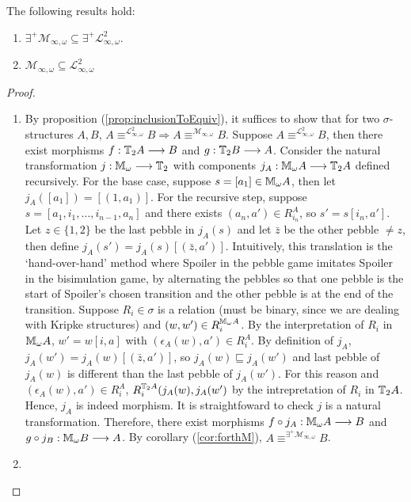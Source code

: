 \begin{prop}
The following results hold:
\begin{enumerate}[label=(\arabic*)]
\item $\exists^{+}\mathcal{M}_{\infty,\omega} \subseteq \exists^{+}\mathcal{L}^{2}_{\infty,\omega}$.
\item $\mathcal{M}_{\infty,\omega} \subseteq \mathcal{L}^{2}_{\infty,\omega}$
\end{enumerate}
\begin{proof}
\begin{enumerate}[label=(\arabic*)]
\item By proposition (\ref{prop:inclusionToEquiv}), it suffices to show that for two $\sigma$-structures $A,B$, $A \equiv^{\mathcal{L}^{2}_{\infty,\omega}} B \Rightarrow A \equiv^{\mathcal{M}_{\infty,\omega}} B$. Suppose $A \equiv^{\mathcal{L}^{2}_{\infty,\omega}} B$, then there exist morphisms $f:{\mathbb{T}_{2}A} \longrightarrow B$ and $g:{\mathbb{T}_{2}B} \longrightarrow A$. Consider the natural transformation $j:{\mathbb{M}_{\omega}} \longrightarrow {\mathbb{T}_{2}}$ with components $j_{A}:{\mathbb{M}_{\omega}A} \longrightarrow {\mathbb{T}_{2}A}$ defined recursively. For the base case, suppose $s = [a_{1}] \in {\mathbb{M}_{\omega}A}$, then let $j_{A}([a_{1}]) = [(1,a_{1})]$. For the recursive step, suppose $s = [a_{1},i_{1},\dots,i_{n-1},a_{n}]$ and there exists $(a_{n},a') \in R_{i_{n}}^{A}$, so $s' = s[i_{n},a']$. Let $z \in \{1,2\}$ be the last pebble in $j_{A}(s)$ and let $\bar{z}$ be the other pebble $\not= z$, then define $j_{A}(s') = j_{A}(s)[(\bar{z},a')]$.  Intuitively, this translation is the `hand-over-hand' method where Spoiler in the pebble game imitates Spoiler in the bisimulation game, by alternating the pebbles so that one pebble is the start of Spoiler's chosen transition and the other pebble is at the end of the transition. Suppose $R_{i} \in \sigma$ is a relation (must be binary, since we are dealing with Kripke structures) and $(w,w') \in R_{i}^{{\mathbb{M}_{\omega}A}}$. By the interpretation of $R_{i}$ in ${\mathbb{M}_{\omega}A}$, $w' = w[i,a]$ with $(\epsilon_{A}(w),a') \in R_{i}^{A}$. By definition of $j_{A}$, $j_{A}(w') = j_{A}(w)[(\bar{z},a')]$, so $j_{A}(w) \sqsubseteq j_{A}(w')$ and last pebble of $j_{A}(w)$ is different than the last pebble of $j_{A}(w')$. For this reason and $(\epsilon_{A}(w),a') \in R_{i}^{A}$, $R_{i}^{{\mathbb{T}_{2}A}}(j_{A}(w),j_{A}(w')$ by the intrepretation of $R_{i}$ in ${\mathbb{T}_{2}A}$. Hence, $j_{A}$ is indeed morphism. It is straightfoward to check $j$ is a natural transformation. Therefore, there exist morphisms $f \circ j_{A}: {\mathbb{M}_{\omega}A} \longrightarrow B$ and $g \circ j_{B}:{\mathbb{M}_{\omega}B} \longrightarrow A$. By corollary (\ref{cor:forthM}), $A \equiv^{\exists^{+}\mathcal{M}_{\infty,\omega}} B$. 
\item   
\end{enumerate}
\end{proof}
\end{prop}
